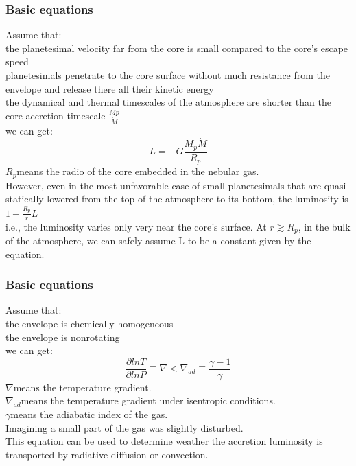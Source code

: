 \documentclass{beamer}
\begin{document}
\begin{frame}
\frametitle{Basic equations}
Assume that:\\
{\small the planetesimal velocity far from the core is small compared to the core’s escape speed\\
planetesimals penetrate to the core surface without much resistance from the envelope and release there all their kinetic energy\\
the dynamical and thermal timescales of the atmosphere are shorter than the core accretion timescale $\frac{Mp}{\dot{M}}$\\}
we can get:
\begin{equation}
L = -G\frac{M_p \dot{M}}{R_p}
\end{equation}
$R_p$means the radio of the core embedded in the nebular gas.\\
{\small However, even in the most unfavorable case of small planetesimals that are quasi-statically lowered from the top of the atmosphere to its bottom, 
the luminosity is $1 - \frac{R_p}{r}L$\\
i.e., the luminosity varies only very near the core’s surface. At $r \gtrsim R_p$, in the bulk of the atmosphere, we can safely assume L to be a constant given by the equation.}
\end{frame}

\begin{frame}
\frametitle{Basic equations}
Assume that:\\
the envelope is chemically homogeneous\\
the envelope is nonrotating\\
we can get:
\begin{equation}
\frac{\partial ln T}{\partial ln P} \equiv \nabla < \nabla_{ad} \equiv \frac{\gamma-1}{\gamma}
\end{equation}
$\nabla$means the temperature gradient.\\
$\nabla_{ad}$means the temperature gradient under isentropic conditions.\\
$\gamma$means the adiabatic index of the gas.\\
Imagining a small part of the gas was slightly disturbed.\\
This equation can be used to determine weather the accretion luminosity is transported by radiative diffusion or convection.
\end{frame}
\end{document}
